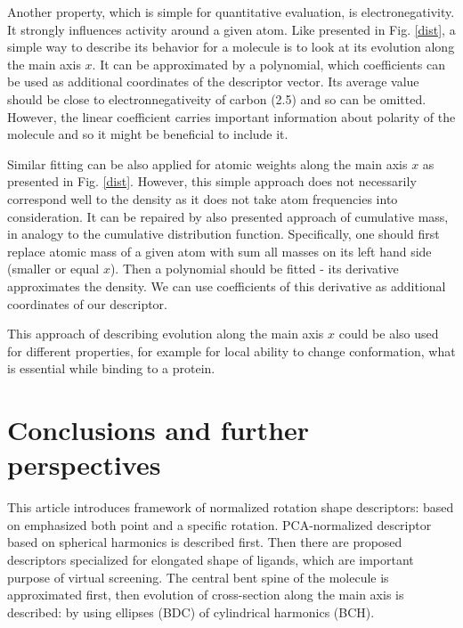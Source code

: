 \documentclass[10pt,journal]{IEEEtranTCOM}
\theoremstyle{plain}
\begin{document}
Another property, which is simple for quantitative evaluation, is electronegativity. It strongly influences activity around a given atom. Like presented in Fig. \ref{dist}, a simple way to describe its behavior for a molecule is to look at its evolution along the main axis $x$. It can be approximated by a polynomial, which coefficients can be used as additional coordinates of the descriptor vector. Its average value should be close to electronnegativeity of carbon (2.5) and so can be omitted. However, the linear coefficient carries important information about polarity of the molecule and so it might be beneficial to include it.

Similar fitting can be also applied for atomic weights along the main axis $x$ as presented in Fig. \ref{dist}. However, this simple approach does not necessarily correspond well to the density as it does not take atom frequencies into consideration. It can be repaired by also presented approach of cumulative mass, in analogy to the cumulative distribution function. Specifically, one should first replace atomic mass of a given atom with sum all masses on its left hand side (smaller or equal $x$). Then a polynomial should be fitted - its derivative approximates the density. We can use coefficients of this derivative as additional coordinates of our descriptor.

This approach of describing evolution along the main axis $x$ could be also used for different properties, for example for local ability to change conformation, what is essential while binding to a protein.

\section{Conclusions and further perspectives}
This article introduces framework of normalized rotation shape descriptors: based on emphasized both point and a specific rotation. PCA-normalized descriptor based on spherical harmonics is described first. Then there are proposed descriptors specialized for elongated shape of ligands, which are important purpose of virtual screening. The central bent spine of the molecule is approximated first, then evolution of cross-section along the main axis is described: by using ellipses (BDC) of cylindrical harmonics (BCH).
\end{document}
